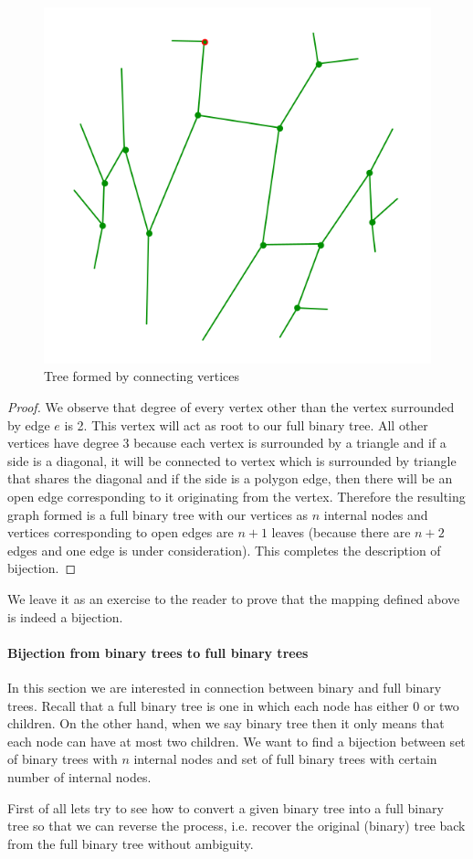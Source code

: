 \begin{figure}[h!]
    \centering
    \includegraphics[width=0.4\linewidth]{images/tree.png}
    \caption{Tree formed by connecting vertices}
    \label{fig:tree}
\end{figure}
\begin{proof}
	We observe that degree of every vertex other than the vertex surrounded by edge $e$ is 2. This vertex will act as root to our full binary tree. All other vertices have degree 3 because each vertex is surrounded by a triangle and if a side is a diagonal, it will be connected to vertex which is surrounded by triangle that shares the diagonal and if the side is a polygon edge, then there will be an open edge corresponding to it originating from the vertex. Therefore the resulting graph formed is a full binary tree with our vertices as $n$ internal nodes and vertices corresponding to open edges are $n+1$ leaves (because there are $n+2$ edges and one edge is under consideration). This completes the description of bijection.
\end{proof}

We leave it as an exercise to the reader to prove that the mapping defined above is indeed a bijection.

\paragraph{Bijection from binary trees to full binary trees}
In this section we are interested in connection between binary and full binary trees. Recall that a full binary tree is one in which each node has either 0 or two children. On the other hand, when we say binary tree then it only means that each node can have at most two children. We want to find a bijection between set of binary trees with $n$ internal nodes and set of full binary trees with certain number of internal nodes. 

First of all lets try to see how to convert a given binary tree into a full binary tree so that we can reverse the process, i.e. recover the original (binary) tree back from the full binary tree without ambiguity. 


